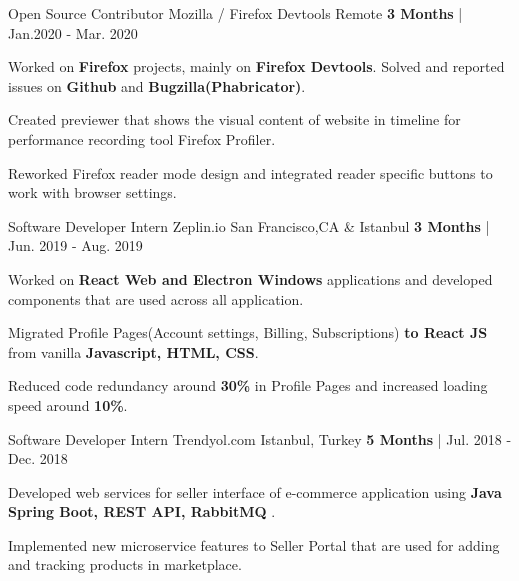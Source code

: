 \begin{cventries}
  \cventry
   {Open Source Contributor} %
    {Mozilla / Firefox Devtools} %
    {Remote} %
    {\textbf{3 Months} | Jan.2020 - Mar. 2020} %
    {
      \begin{cvitems} %
        \item {Worked on \textbf{Firefox} projects, mainly on \textbf{Firefox Devtools}. Solved and reported issues on \textbf{Github} and \textbf{Bugzilla(Phabricator)}.}
        \item {Created previewer that shows the visual content of website in timeline for performance recording tool Firefox Profiler.
        \item {Reworked Firefox reader mode design and integrated reader specific buttons to work with browser settings.}
}
      \end{cvitems}
    }
  \cventry
   {Software Developer Intern} %
    {Zeplin.io} %
    {San Francisco,CA \& Istanbul} %
    {\textbf{3 Months} | Jun. 2019 - Aug. 2019} %
    {
      \begin{cvitems} %
        \item {Worked on \textbf{React Web and Electron Windows} applications and developed components that are used across all application.}
		\item {Migrated Profile Pages(Account settings, Billing, Subscriptions) \textbf{to React JS} from vanilla \textbf{Javascript, HTML, CSS}.}
        \item {Reduced code redundancy around \textbf{30\%} in Profile Pages and increased loading speed around \textbf{10\%}. }
      \end{cvitems}
    }
  \cventry
   {Software Developer Intern} %
    {Trendyol.com} %
    {Istanbul, Turkey} %
    {\textbf{5 Months} | Jul. 2018 - Dec. 2018} %
    {
      \begin{cvitems} %
		 \item {Developed web services for seller interface of e-commerce application using \textbf{Java Spring Boot, REST API, RabbitMQ} .}
        \item {Implemented new microservice features to Seller Portal that are used for adding and tracking products in marketplace.}
      \end{cvitems}
    }



\end{cventries}
